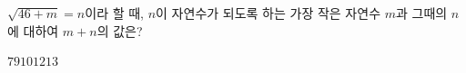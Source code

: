 $\sqrt{46+m}=n$이라 할 때, $n$이 자연수가 되도록 하는 가장 작은 자연수 $m$과 그때의 $n$에 대하여 $m+n$의 값은?
\begin{choices32}{$7$}{$9$}{$10$}{$12$}{$13$}\end{choices32}
